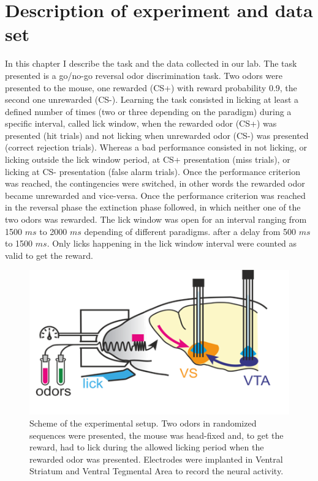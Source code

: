 \chapter{Description of experiment and data set}
\label{chap:Dataset}
In this chapter I describe the task and the data collected in our lab.
The task presented is a go/no-go reversal odor discrimination task. Two odors were presented to the mouse, one rewarded (CS+) with reward probability 0.9, the second one unrewarded (CS-). Learning the task consisted in licking at least a defined number of times (two or three depending on the paradigm) during a specific interval, called lick window, when the rewarded odor (CS+) was presented (hit trials) and not licking when unrewarded odor (CS-) was presented (correct rejection trials). Whereas a bad performance consisted in not licking, or licking outside the lick window period, at CS+ presentation (miss trials), or licking at CS- presentation (false alarm trials). Once the performance criterion was reached, the contingencies were switched, in other words the rewarded odor became unrewarded and vice-versa. Once the performance criterion was reached in the reversal phase the extinction phase followed, in which neither one of the two odors was rewarded. The lick window was open for an interval ranging from 1500 $ms$ to 2000 $ms$ depending of different paradigms. after a delay from 500 $ms$ to 1500 $ms$. Only licks happening in the lick window interval were counted as valid to get the reward.
\begin{figure}
    \centering
    \includegraphics[scale=1]{figures/Experiment.png}
    \caption{Scheme of the experimental setup. Two odors in randomized sequences were presented, the mouse was head-fixed and, to get the reward, had to lick during the allowed licking period when the rewarded odor was presented. Electrodes were implanted in Ventral Striatum and Ventral Tegmental Area to record the neural activity. }
    \label{fig:experiment}
\end{figure}

